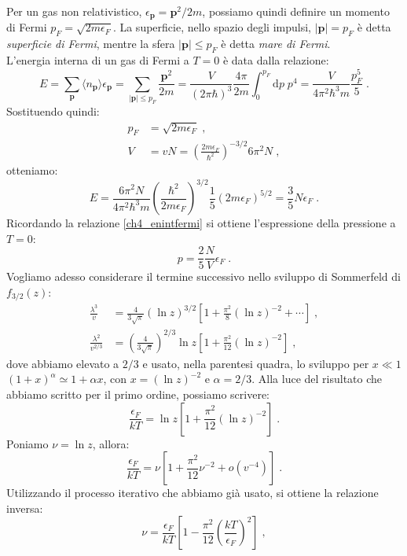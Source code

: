 \documentclass[10pt,a4paper]{report}
\theoremstyle{definition}
\numberwithin{equation}{section}
\newcommand{\diff}[1][]{\mathrm{d}#1}
\newcommand{\bra}{\langle}
\newcommand{\ket}{\rangle}
\begin{document}
Per un gas non relativistico, $\epsilon_{\mathbf{p}}=\mathbf{p}^2/2m$, possiamo quindi definire un momento di Fermi $p_F=\sqrt{2m\epsilon_F}$. La superficie, nello spazio degli impulsi, $|\mathbf{p}|=p_F$ è detta \emph{superficie di Fermi}, mentre la sfera $|\mathbf{p}|\le p_F$ è detta \emph{mare di Fermi}. \\
L'energia interna di un gas di Fermi a $T=0$ è data dalla relazione:
$$
E=\sum_{\mathbf{p}}\bra n_{\mathbf{p}}\ket\epsilon_{\mathbf{p}}=\sum_{|\mathbf{p}|\le p_F}\frac{\mathbf{p}^2}{2m}=\frac{V}{(2\pi\hbar)^3}\frac{4\pi}{2m}\int_0^{p_F}\diff{p}\;p^4=\frac{V}{4\pi^2\hbar^3m}\frac{p_F^5}{5}\;.
$$
Sostituendo quindi:
\begin{align*}
p_F&=\sqrt{2m\epsilon_F}\;, \\
V&=vN=\left(\frac{2m\epsilon_F}{\hbar^2}\right)^{-3/2}6\pi^2N\;,
\end{align*}
otteniamo:
\begin{equation}
E=\frac{6\pi^2N}{4\pi^2\hbar^3m}\left(\frac{\hbar^2}{2m\epsilon_F}\right)^{3/2}\frac{1}{5}(2m\epsilon_F)^{5/2}=\frac{3}{5}N\epsilon_F\;.
\end{equation}
Ricordando la relazione \eqref{ch4_enintfermi} si ottiene l'espressione della pressione a $T=0$:
\begin{equation}
p=\frac{2}{5}\frac{N}{V}\epsilon_F\;.
\end{equation}
Vogliamo adesso considerare il termine successivo nello sviluppo di Sommerfeld di $f_{3/2}(z)$:
\begin{align*}
\frac{\lambda^3}{v}&=\frac{4}{3\sqrt{\pi}}(\ln z)^{3/2}\left[1+\frac{\pi^2}{8}(\ln z)^{-2}+\cdots\right]\;, \\
\frac{\lambda^2}{v^{2/3}}&=\left(\frac{4}{3\sqrt{\pi}}\right)^{2/3}\ln z\left[1+\frac{\pi^2}{12}(\ln z)^{-2}\right]\;,
\end{align*}
dove abbiamo elevato a $2/3$ e usato, nella parentesi quadra, lo sviluppo per $x\ll 1$ $(1+x)^{\alpha}\simeq 1+\alpha x$, con $x=(\ln z)^{-2}$ e $\alpha=2/3$. Alla luce del risultato che abbiamo scritto per il primo ordine, possiamo scrivere:
\begin{equation}
\frac{\epsilon_F}{kT}=\ln z\left[1+\frac{\pi^2}{12}(\ln z)^{-2}\right]\;.
\end{equation}
Poniamo $\nu=\ln z$, allora:
$$
\frac{\epsilon_F}{kT}=\nu\left[1+\frac{\pi^2}{12}\nu^{-2}+o(v^{-4})\right]\;.
$$
Utilizzando il processo iterativo che abbiamo già usato, si ottiene la relazione inversa:
\begin{equation}
\nu=\frac{\epsilon_F}{kT}\left[1-\frac{\pi^2}{12}\left(\frac{kT}{\epsilon_F}\right)^2\right]\;, \label{ch4_nu}
\end{equation}
\end{document}
